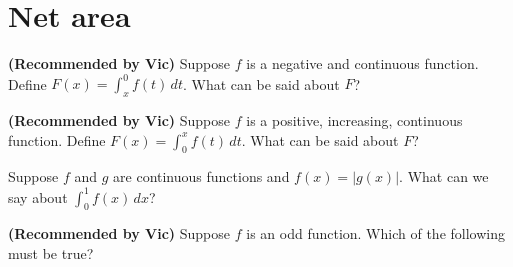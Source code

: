 \documentclass{ximera}
\newcommand{\recommendation}[1]{\textbf{(Recommended by #1)}}
\begin{document}
\clearpage

\section{Net area}

\begin{problem}
\recommendation{Vic}
  Suppose $f$ is a negative and continuous function.  Define $F(x) = \int_x^0 f(t) \, dt$.  What can be said about $F$?
  \begin{multipleChoice}
  \end{multipleChoice}
\end{problem}

\begin{problem}
\recommendation{Vic}
  Suppose $f$ is a positive, increasing, continuous function.  Define $F(x) = \int_0^x f(t) \, dt$.  What can be said about $F$?
  \begin{multipleChoice}
  \end{multipleChoice}
\end{problem}

\begin{problem}
  Suppose $f$ and $g$ are continuous functions and $f(x) = |g(x)|$.  What can we say about $\int_0^1 f(x) \, dx$?
  \begin{multipleChoice}
  \end{multipleChoice}
\end{problem}


\begin{problem}
\recommendation{Vic}
  Suppose $f$ is an odd function. Which of the following must be true?
  \begin{multipleChoice}
  \end{multipleChoice}
\end{problem}

\clearpage
\end{document}
